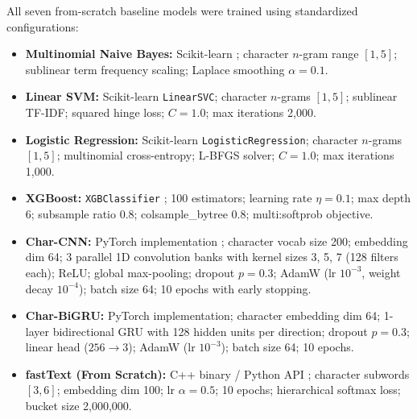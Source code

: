 \documentclass[11pt]{article}
\begin{document}
All seven from-scratch baseline models were trained using standardized configurations:
\begin{itemize}
    \item \textbf{Multinomial Naive Bayes:} Scikit-learn \cite{pedregosa2011scikit}; character $n$-gram range $[1, 5]$; sublinear term frequency scaling; Laplace smoothing $\alpha = 0.1$.
    \item \textbf{Linear SVM:} Scikit-learn \texttt{LinearSVC}; character $n$-grams $[1, 5]$; sublinear TF-IDF; squared hinge loss; $C=1.0$; max iterations 2,000.
    \item \textbf{Logistic Regression:} Scikit-learn \texttt{LogisticRegression}; character $n$-grams $[1, 5]$; multinomial cross-entropy; L-BFGS solver; $C=1.0$; max iterations 1,000.
    \item \textbf{XGBoost:} \texttt{XGBClassifier} \cite{chen2016xgboost}; 100 estimators; learning rate $\eta = 0.1$; max depth 6; subsample ratio 0.8; colsample\_bytree 0.8; multi:softprob objective.
    \item \textbf{Char-CNN:} PyTorch implementation \cite{zhang2015character}; character vocab size 200; embedding dim 64; 3 parallel 1D convolution banks with kernel sizes 3, 5, 7 (128 filters each); ReLU; global max-pooling; dropout $p=0.3$; AdamW (lr $10^{-3}$, weight decay $10^{-4}$); batch size 64; 10 epochs with early stopping.
    \item \textbf{Char-BiGRU:} PyTorch implementation; character embedding dim 64; 1-layer bidirectional GRU with 128 hidden units per direction; dropout $p=0.3$; linear head ($256 \to 3$); AdamW (lr $10^{-3}$); batch size 64; 10 epochs.
    \item \textbf{fastText (From Scratch):} C++ binary / Python API \cite{joulin-etal-2017-bag}; character subwords $[3, 6]$; embedding dim 100; lr $\alpha = 0.5$; 10 epochs; hierarchical softmax loss; bucket size 2,000,000.
\end{itemize}
\end{document}
